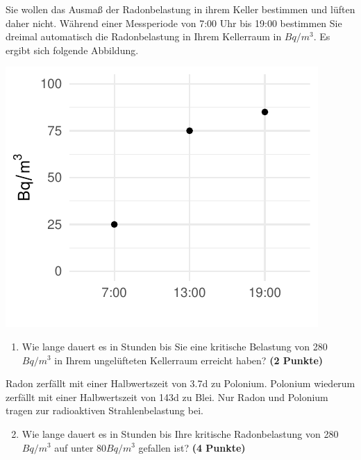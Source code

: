 \documentclass[a4paper, 9pt]{scrartcl}\usepackage[]{graphicx}\usepackage[]{xcolor}
\makeatletter
\def\maxwidth{ %
  \ifdim\Gin@nat@width>\linewidth
    \linewidth
  \else
    \Gin@nat@width
  \fi
}
\newenvironment{knitrout}{}{} %
\makeatother
\begin{document}
Sie wollen das Ausma{\ss} der Radonbelastung in ihrem Keller bestimmen und
l{\"u}ften daher nicht. W{\"a}hrend einer Messperiode von 7:00 Uhr bis
19:00 bestimmen Sie dreimal automatisch die Radonbelastung in
Ihrem Kellerraum in $Bq/m^3$. Es ergibt sich folgende Abbildung.

\begin{knitrout}
\color{fgcolor}

{\centering \includegraphics[width=\maxwidth]{img/math-10-1} 

}


\end{knitrout}

\vspace{-0.75cm}

\begin{enumerate}
\item Wie lange dauert es in Stunden bis Sie eine kritische Belastung von
  280$Bq/m^3$ in Ihrem ungel{\"u}fteten Kellerraum erreicht haben?
  \textbf{(2 Punkte)}
\end{enumerate}

Radon zerf{\"a}llt mit einer Halbwertszeit von 3.7d zu
Polonium. Polonium wiederum zerf{\"a}llt mit einer Halbwertszeit von
143d zu Blei. Nur Radon und Polonium tragen zur
radioaktiven Strahlenbelastung bei.

\begin{enumerate}
  \setcounter{enumi}{1}
\item Wie lange dauert es in Stunden bis Ihre kritische Radonbelastung von
  280$Bq/m^3$ auf unter 80$Bq/m^3$ gefallen ist?
  \textbf{(4 Punkte)}
\end{enumerate}
\end{document}
